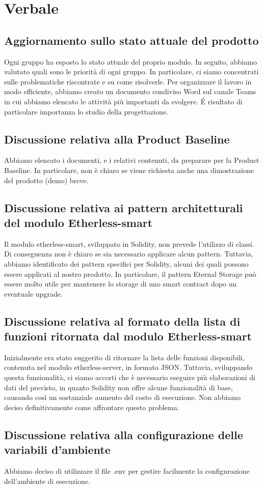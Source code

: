 \section{Verbale}
	\subsection{Aggiornamento sullo stato attuale del prodotto}
	Ogni gruppo ha esposto lo stato attuale del proprio modulo\textit{}.
	In seguito, abbiamo valutato quali sono le priorità di ogni gruppo. In particolare, ci siamo concentrati sulle problematiche riscontrate e su come risolverle. Per organizzare il lavoro in modo efficiente, abbiamo creato un documento condiviso Word sul canale Teams\textit{} in cui abbiamo elencato le attività più importanti da svolgere. \'E risultato di particolare importanza lo studio della progettazione. 
	\subsection{Discussione relativa alla Product Baseline\textit{}}
	Abbiamo elencato i documenti, e i relativi contenuti, da preparare per la Product Baseline\textit{}. In particolare, non è chiaro se viene richiesta anche una dimostrazione del prodotto (demo\textit{}) breve.
	\subsection{Discussione relativa ai pattern architetturali del modulo Etherless-smart}
	Il modulo etherless-smart, sviluppato in Solidity\textit{}, non prevede l'utilizzo di classi. Di conseguenza non è chiaro se sia necessario applicare alcun pattern. Tuttavia, abbiamo identificato dei pattern specifici per Solidity\textit{}, alcuni dei quali possono essere applicati al nostro prodotto. In particolare, il pattern Eternal Storage può essere molto utile per mantenere lo storage di uno smart contract\textit{} dopo un eventuale upgrade.
	\subsection{Discussione relativa al formato della lista di funzioni ritornata dal modulo Etherless-smart}
	Inizialmente era stato suggerito di ritornare la lista delle funzioni disponibili, contenuta nel modulo\textit{} etherless-server, in formato JSON\textit{}. Tuttavia, sviluppando questa funzionalità, ci siamo accorti che è necessario eseguire più elaborazioni di dati del previsto, in quanto Solidity\textit{} non offre alcune funzionalità di base, causando così un sostanziale aumento del costo di esecuzione. Non abbiamo deciso definitivamente come affrontare questo problema.
	\subsection{Discussione relativa alla configurazione delle variabili d'ambiente}
    Abbiamo deciso di utilizzare il file .env per gestire facilmente la configurazione dell'ambiente di esecuzione.